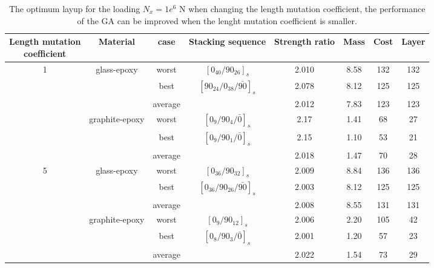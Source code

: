 \renewcommand{\arraystretch}{1.2}
\begin{table}
\caption{The optimum layup for the loading $N_x=1e^6$ N when changing the
length mutation coefficient, the performance of the GA can be improved
when the lenght mutation coefficient is smaller.} \centering
\begin{adjustbox}{width=1\textwidth}
	\begin{tabular}{cccccccc}
	\toprule
	\makecell{Length mutation \\ coefficient}		     &	 Material		               	 & case     & Stacking sequence    & Strength ratio  & Mass  &  Cost   & Layer    \\ 
	\midrule																															  
	\multirow{6}{*}{1} &	\multirow{3}{*}{glass-epoxy}   	 & worst     &  $[0_{40}/90_{26}]_s$ & 2.010           &  8.58  & 132     & 132   \\
					   &								     & best      &  $[90_{24}/0_{38}/\bar{90}]_s$ & 2.078  &  8.12  & 125     & 125  \\
					     &									 & average   &    		           & 2.012           &  7.83  & 123     & 123  \\
						 &	\multirow{3}{*}{graphite-epoxy}	 & worst     &  $[0_{9}/90_{4}/\bar{0}]_s$ & 2.17             & 1.41   & 68      & 27      \\
					     &								     & best      &  $[0_{9}/90_{1}/\bar{0}]_s$  & 2.15           & 1.10   & 53      & 21      \\
					     &								     & average   &                     & 2.018           & 1.47   & 70      & 28      \\ 
	\multirow{6}{*}{5} &	\multirow{3}{*}{glass-epoxy}   	 & worst     &  $[0_{36}/90_{32}]_s$ &  2.009          & 8.84   &  136    &  136   \\
					   &								     & best      &  $[0_{36}/90_{26}/\bar{90}]_s$ &  2.003          & 8.12   &  125    &  125   \\
					     &									 & average   &                     &  2.008          & 8.55   &  131    &  131  \\
						 &	\multirow{3}{*}{graphite-epoxy}	 & worst     &  $[0_{9}/90_{12}]_s$ &  2.006          & 2.20   &  105    &  42  \\
						 &								     & best      &  $[0_{8}/90_{3}/\bar{0}]_s$  &  2.001          & 1.20   &  57     &  23  \\
					     &								     & average   &                    &   2.022          & 1.54   &  73     &  29  \\
	\bottomrule																															  
\end{tabular}
\end{adjustbox}
\label{tab:optimum_layup}
\end{table}
            
            
